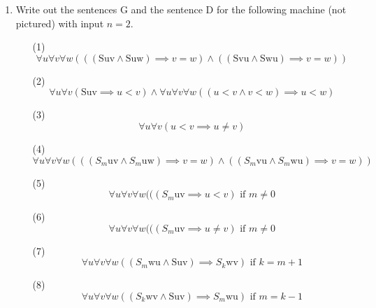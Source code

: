 
\usepackage{amsmath, dsfont, mathtools, verbatim, tikz, float, textcomp, mathrsfs}

\usetikzlibrary{arrows,automata}

\oddsidemargin 0in
\evensidemargin 0in
\textwidth 6.5in
\topmargin -0.5in
\textheight 9.0in
\newcommand{\norm}[1]{\left\lVert #1 \right\rVert}
\newcommand{\?}{\stackrel{?}{=}}
\DeclarePairedDelimiter{\ceil}{\lceil}{\rceil}

\newcommand{\sm}[2]{S_{#1}\text{#2}}
\newcommand{\q}[2]{Q_{#1}\text{#2}}
\newcommand{\s}[1]{\text{S#1}}
\newcommand{\at}[1]{\text{@#1}}
\newcommand{\m}[1]{\text{M#1}}




\pagestyle{myheadings}

\begin{enumerate}
  \item
    \begin{question}
      Write out the sentences G and the sentence D for the following machine (not pictured) with input $n=2$.
    \end{question}
    \begin{enumerate}
      We have the same ``background information'':
      \item[(1)]
        $$\forall u \forall v \forall w (((\s{uv} \land \s{uw}) \implies v = w) \land ((\s{vu} \land \s{wu}) \implies v = w))$$
      \item [(2)]
        $$\forall u \forall v (\s{uv} \implies u < v) \land \forall u \forall v \forall w ((u < v \land v < w) \implies u < w)$$
      \item [(3)]
        $$\forall u \forall v (u < v \implies u \neq v)$$
      \item [(4)]
        $$\forall u \forall v \forall w (((\sm{m}{uv} \land \sm{m}{uw}) \implies v = w) \land ((\sm{m}{vu} \land \sm{m}{wu}) \implies v = w))$$
      \item [(5)]
        $$\forall u \forall v \forall w (((\sm{m}{uv} \implies u < v) \text{  if } m \neq 0$$
      \item [(6)]
        $$\forall u \forall v \forall w (((\sm{m}{uv} \implies u \neq v) \text{  if } m \neq 0$$
      \item [(7)]
        $$\forall u \forall v \forall w ((\sm{m}{wu} \land \s{uv}) \implies \sm{k}{wv}) \text{  if } k = m+1$$
      \item [(8)]
        $$\forall u \forall v \forall w ((\sm{k}{wv} \land \s{uv}) \implies \sm{m}{wu}) \text{  if } m = k-1$$

\end{enumerate}
\end{enumerate}
